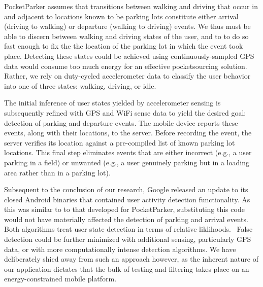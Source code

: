 PocketParker assumes that transitions between walking and driving that occur
in and adjacent to locations known to be parking lots constitute either
arrival (driving to walking) or departure (walking to driving) events.  We thus
must be able to discern between walking and driving states of the user, and to
to do so fast enough to fix the the location of the parking lot in which the
event took place.  Detecting these states could be achieved using
continuously-sampled GPS data would consume too much energy for an effective
pocketsourcing solution.  Rather, we rely on duty-cycled accelerometer data to
classify the user behavior into one of three states: walking, driving, or idle.

The initial inference of user states yielded by accelerometer sensing is
subsequently refined with GPS and WiFi sense data to yield the desired goal:
detection of parking and departure events.  The mobile device reports these
events, along with their locations, to the server.  Before recording the event,
the server verifies its location against a pre-compiled list of known parking
lot locations.  This final step eliminates events that are either
incorrect (e.g., a user parking in a field) or unwanted (e.g., a user genuinely
parking but in a loading area rather than in a parking lot).

Subsequent to the conclusion of our research, Google released an update to its
closed Android binaries that contained user activity detection functionality.
As this was similar to to that developed for PocketParker, substituting this
code would not have materially affected the detection of parking and arrival
events.  Both algorithms treat user state detection in terms of relative
liklihoods.~\cite{recognition-confidence}  False detection could be further minimized with
additional sensing, particularly GPS data, or with more computationally intense
detection algorithms.  We have deliberately shied away from such an approach
however, as the inherent nature of our application dictates that the bulk of
testing and filtering takes place on an energy-constrained mobile platform.
